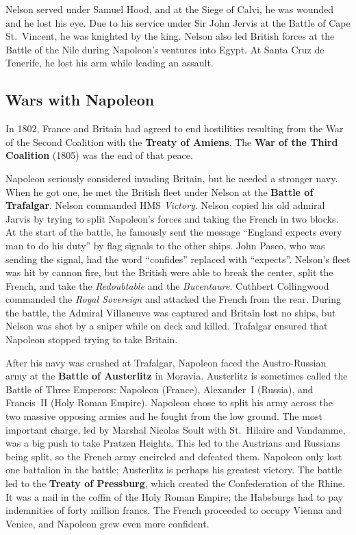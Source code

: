 Nelson served under Samuel Hood, and at the Siege of Calvi, he was wounded and he lost his eye.
Due to his service under Sir John Jervis at the Battle of Cape St.\ Vincent, he was knighted by the king.
Nelson also led British forces at the Battle of the Nile during Napoleon's ventures into Egypt.
At Santa Cruz de Tenerife, he lost his arm while leading an assault.

\subsection*{Wars with Napoleon}

In 1802, France and Britain had agreed to end hostilities resulting from the War of the Second Coalition
with the \textbf{Treaty of Amiens}.
The \textbf{War of the Third Coalition} (1805) was the end of that peace.

Napoleon seriously considered invading Britain, but he needed a stronger navy.
When he got one, he met the British fleet under Nelson at the \textbf{Battle of Trafalgar}.
Nelson commanded HMS \textit{Victory}.
Nelson copied his old admiral Jarvis by trying to split Napoleon's forces and taking the French in two blocks.
At the start of the battle, he famously sent the message
``England expects every man to do his duty'' by flag signals to the other ships.
John Pasco, who was sending the signal, had the word ``confides'' replaced with ``expects''.
Nelson's fleet was hit by cannon fire, but the British were able to break the center, split the French,
and take the \textit{Redoubtable} and the \textit{Bucentaure}.
Cuthbert Collingwood commanded the \textit{Royal Sovereign} and attacked the French from the rear.
During the battle, the Admiral Villaneuve was captured and Britain lost no ships,
but Nelson was shot by a sniper while on deck and killed.
Trafalgar ensured that Napoleon stopped trying to take Britain.

After his navy was crushed at Trafalgar,
Napoleon faced the Austro-Russian army at the \textbf{Battle of Austerlitz} in Moravia.
Austerlitz is sometimes called the Battle of Three Emperors:
Napoleon (France), Alexander~I (Russia), and Francis~II (Holy Roman Empire).
Napoleon chose to split his army across the two massive opposing armies and he fought from the low ground.
The most important charge, led by Marshal Nicolas Soult with St.\ Hilaire and Vandamme,
was a big push to take Pratzen Heights.
This led to the Austrians and Russians being split, so the French army encircled and defeated them.
Napoleon only lost one battalion in the battle; Austerlitz is perhaps his greatest victory.
The battle led to the \textbf{Treaty of Pressburg}, which created the Confederation of the Rhine.
It was a nail in the coffin of the Holy Roman Empire;
the Habsburgs had to pay indemnities of forty million francs.
The French proceeded to occupy Vienna and Venice, and Napoleon grew even more confident.

